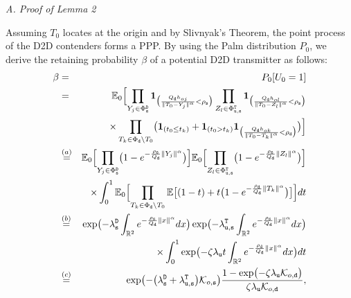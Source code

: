 \documentclass[twocolumn,english]{IEEEtran}
\theoremstyle{plain}
\theoremstyle{definition}
\begin{document}
\appendix{}

\emph{A. Proof of Lemma 2}

Assuming $T_{0}$ locates at the origin and by Slivnyak's Theorem,
the point process of the D2D contenders forms a PPP. By using the
Palm distribution $P_{0}$, we derive the retaining probability $\beta$
of a potential D2D transmitter as follows:
\begin{eqnarray*}
\beta & = & P_{0}[U_{0}=1]\\
 & = & \mathbb{E}_{0}\Bigl[\prod_{Y_{j}\in\Phi_{\mathtt{s}}^{\mathtt{D}}}\mathbf{1}_{\bigl(\frac{Q_{\mathtt{d}}h_{oj}}{\Vert T_{0}-Y_{j}\Vert^{\alpha}}<\rho_{\mathtt{s}}\bigr)}\prod_{Z_{l}\in\Phi_{\mathtt{u},\mathtt{s}}^{\mathtt{T}}}\mathbf{1}_{\bigl(\frac{Q_{\mathtt{d}}h_{ol}}{\Vert T_{0}-Z_{l}\Vert^{\alpha}}<\rho_{\mathtt{s}}\bigr)}\\
 &  & \times\prod_{T_{k}\in\Phi_{\mathtt{d}}\backslash T_{0}}\bigl(\mathbf{1}_{(t_{0}\leq t_{k})}+\mathbf{1}_{(t_{0}>t_{k})}\mathbf{1}_{\bigl(\frac{Q_{\mathtt{d}}h_{ok}}{\Vert T_{0}-T_{k}\Vert^{\alpha}}<\rho_{\mathtt{d}}\bigr)}\bigr)\Bigr]\\
 & \overset{(a)}{=} & \mathbb{E}_{0}\Bigl[\prod_{Y_{j}\in\Phi_{\mathtt{s}}^{\mathtt{D}}}\bigl(1-e^{-\frac{\rho_{\mathtt{s}}}{Q_{\mathtt{d}}}\Vert Y_{j}\Vert^{\alpha}}\bigr)\Bigr]\mathbb{E}_{0}\Bigl[\prod_{Z_{l}\in\Phi_{\mathtt{u},\mathtt{s}}^{\mathtt{T}}}\bigl(1-e^{-\frac{\rho_{\mathtt{s}}}{Q_{\mathtt{d}}}\Vert Z_{l}\Vert^{\alpha}}\bigr)\Bigr]\\
 &  & \times\int_{0}^{1}\mathbb{E}_{0}\Bigl[\prod_{T_{k}\in\Phi_{\mathtt{d}}\backslash T_{0}}\mathbb{E}\bigl[\left(1-t\right)+t\bigl(1-e^{-\frac{\rho_{\mathtt{d}}}{Q_{\mathtt{d}}}\Vert T_{k}\Vert^{\alpha}}\bigr)\bigr]\Bigr]dt\\
 & \overset{(b)}{=} & \exp\bigl(-\lambda_{\mathtt{s}}^{\mathtt{D}}\int_{\mathbb{R}^{2}}e^{-\frac{\rho_{\mathtt{s}}}{Q_{\mathtt{d}}}\Vert x\Vert^{\alpha}}dx\bigr)\exp\bigl(-\lambda_{\mathtt{u,s}}^{\mathtt{T}}\int_{\mathbb{R}^{2}}e^{-\frac{\rho_{\mathtt{s}}}{Q_{\mathtt{d}}}\Vert x\Vert^{\alpha}}dx\bigr)\\
 &  & \times\int_{0}^{1}\exp\bigl(-\zeta\lambda_{\mathtt{u}}t\int_{\mathbb{R}^{2}}e^{-\frac{\rho_{\mathtt{d}}}{Q_{\mathtt{d}}}\Vert x\Vert^{\alpha}}dx\bigr)dt\\
 & \overset{\left(c\right)}{=} & \exp\bigl(-\bigl(\lambda_{\mathtt{s}}^{\mathtt{D}}+\lambda_{\mathtt{u,s}}^{\mathtt{T}}\bigr)\mathcal{K}_{o,\mathtt{s}}\bigr)\frac{1-\exp\bigl(-\zeta\lambda_{\mathtt{u}}\mathcal{K}_{o,\mathtt{d}}\bigr)}{\zeta\lambda_{\mathtt{u}}\mathcal{K}_{o,\mathtt{d}}},
\end{eqnarray*}
\end{document}

